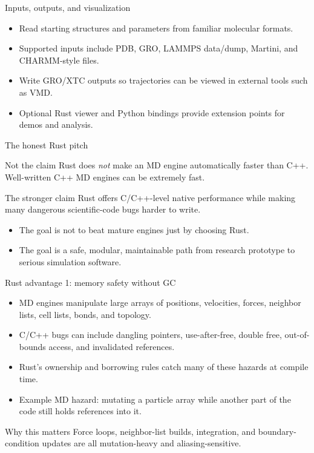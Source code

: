 \documentclass[aspectratio=169]{beamer}
\begin{document}
\begin{frame}{Inputs, outputs, and visualization}
\begin{itemize}
  \item Read starting structures and parameters from familiar molecular formats.
  \item Supported inputs include PDB, GRO, LAMMPS data/dump, Martini, and CHARMM-style files.
  \item Write GRO/XTC outputs so trajectories can be viewed in external tools such as VMD.
  \item Optional Rust viewer and Python bindings provide extension points for demos and analysis.
\end{itemize}
\end{frame}

\begin{frame}{The honest Rust pitch}
\begin{block}{Not the claim}
Rust does \emph{not} make an MD engine automatically faster than C++.
Well-written C++ MD engines can be extremely fast.
\end{block}
\begin{block}{The stronger claim}
Rust offers C/C++-level native performance while making many dangerous scientific-code bugs harder to write.
\end{block}
\begin{itemize}
  \item The goal is not to beat mature engines just by choosing Rust.
  \item The goal is a safe, modular, maintainable path from research prototype to serious simulation software.
\end{itemize}
\end{frame}

\begin{frame}{Rust advantage 1: memory safety without GC}
\begin{itemize}
  \item MD engines manipulate large arrays of positions, velocities, forces, neighbor lists, cell lists, bonds, and topology.
  \item C/C++ bugs can include dangling pointers, use-after-free, double free, out-of-bounds access, and invalidated references.
  \item Rust's ownership and borrowing rules catch many of these hazards at compile time.
  \item Example MD hazard: mutating a particle array while another part of the code still holds references into it.
\end{itemize}
\begin{block}{Why this matters}
Force loops, neighbor-list builds, integration, and boundary-condition updates are all mutation-heavy and aliasing-sensitive.
\end{block}
\end{frame}
\end{document}
